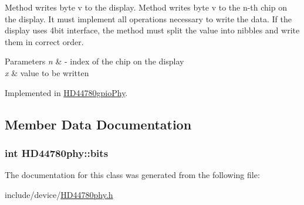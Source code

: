 Method writes byte v to the display. Method writes byte v to the n-\/th chip on the display. It must implement all operations necessary to write the data. If the display uses 4bit interface, the method must split the value into nibbles and write them in correct order. 


\begin{DoxyParams}{Parameters}
{\em n} & -\/ index of the chip on the display \\
\hline
{\em x} & value to be written \\
\hline
\end{DoxyParams}


Implemented in \hyperlink{class_h_d44780gpio_phy_a1c8e591c8c4c8287f70a7ba398ebb744}{H\-D44780gpio\-Phy}.



\subsection{Member Data Documentation}
\hypertarget{class_h_d44780phy_aa50b8a72c2a3418cda74b4693e8e1253}{
\subsubsection[{bits}]{\setlength{\rightskip}{0pt plus 5cm}int H\-D44780phy\-::bits\hspace{0.3cm}{\ttfamily [protected]}}}\label{class_h_d44780phy_aa50b8a72c2a3418cda74b4693e8e1253}


The documentation for this class was generated from the following file\-:\begin{DoxyCompactItemize}
\item 
include/device/\hyperlink{_h_d44780phy_8h}{H\-D44780phy.\-h}\end{DoxyCompactItemize}
